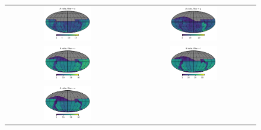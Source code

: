 \documentclass[preprintm,linenumbers]{aastex631}
\begin{document}
	\begin{figure}
		\centering
		\begin{tabular}{c c}
			\includegraphics[width=0.4\textwidth]{results/skymaps/skymap_first_year_one_snap_v4_0_10yrs_db_noDD_noTwi_nside-256_CountMetric_u_noDD_noTwi.pdf} &
			\includegraphics[width=0.4\textwidth]{results/skymaps/skymap_first_year_one_snap_v4_0_10yrs_db_noDD_noTwi_nside-256_CountMetric_g_noDD_noTwi.pdf} \\
			\includegraphics[width=0.4\textwidth]{results/skymaps/skymap_first_year_one_snap_v4_0_10yrs_db_noDD_noTwi_nside-256_CountMetric_r_noDD_noTwi.pdf} &
			\includegraphics[width=0.4\textwidth]{results/skymaps/skymap_first_year_one_snap_v4_0_10yrs_db_noDD_noTwi_nside-256_CountMetric_i_noDD_noTwi.pdf} \\
			\includegraphics[width=0.4\textwidth]{results/skymaps/skymap_first_year_one_snap_v4_0_10yrs_db_noDD_noTwi_nside-256_CountMetric_z_noDD_noTwi.pdf} &

\end{tabular}
\end{figure}
\end{document}
